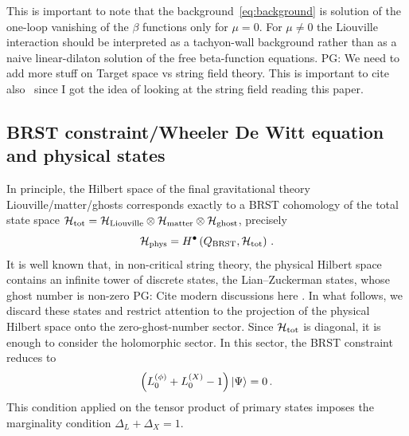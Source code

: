 \documentclass[a4paper]{article}
\newcommand{\purple}[1]{{\color{purple} #1 \color{black}}}
\newcommand{\PG}[1]{{\purple{PG: #1}}} %
\begin{document}
This is important to note that the background~\eqref{eq:background} is solution of the one-loop vanishing of the $\beta$ functions only for $\mu=0$. For $\mu\neq0$ the Liouville interaction should be interpreted as a tachyon-wall background rather than as a naive linear-dilaton solution of the free beta-function equations.
\PG{We need to add more stuff on Target space vs string field theory. This is important to cite also~\cite{Balasubramanian_2018} since I got the idea of looking at the string field reading this paper.}

\subsection{BRST constraint/Wheeler De Witt equation and physical states}
In principle, the Hilbert space of the final gravitational theory Liouville/matter/ghosts corresponds exactly to a BRST cohomology of the total state space $\mathcal{H}_{\rm tot}=\mathcal{H}_{\rm Liouville}\otimes \mathcal{H}_{\rm matter}\otimes\mathcal{H}_{\rm ghost}$, precisely
\begin{equation}
    \mathcal{H}_{\rm phys} = H^{\bullet}\left(Q_{\rm BRST}, \mathcal{H}_{\rm tot}\right)\,.
\end{equation}
It is well known that, in non-critical string theory, the physical Hilbert space contains an infinite tower of discrete states, the Lian--Zuckerman states, whose ghost number is non-zero\PG{Cite modern discussions here}. In what follows, we discard these states and restrict attention to the projection of the physical Hilbert space onto the zero-ghost-number sector. Since $\mathcal{H}_{\rm tot}$ is diagonal, it is enough to consider the holomorphic sector. In this sector, the BRST constraint reduces to
\begin{equation}
    \left(L_0^{(\phi)} + L_0^{(X)} - 1\right)\ket{\Psi}=0\,.
\end{equation}
This condition applied on the tensor product of primary states imposes the marginality condition $\Delta_L +\Delta_X =1$.
\end{document}
